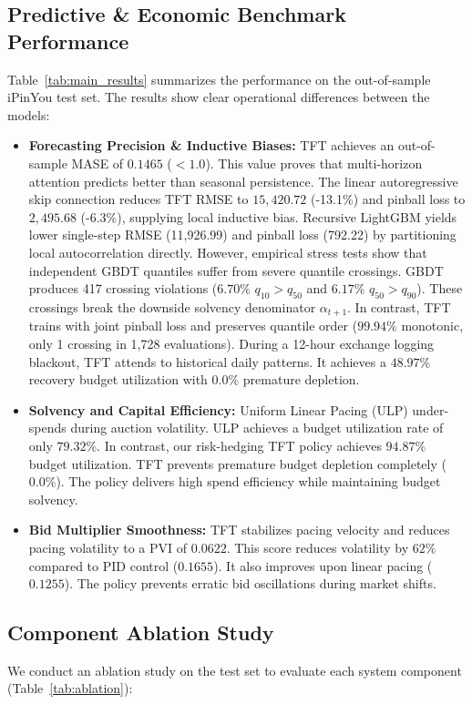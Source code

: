 \documentclass[sigconf]{acmart}
\begin{document}
\subsection{Predictive \& Economic Benchmark Performance}
Table~\ref{tab:main_results} summarizes the performance on the out-of-sample iPinYou test set. The results show clear operational differences between the models:
\begin{itemize}
  \item \textbf{Forecasting Precision \& Inductive Biases:} TFT achieves an out-of-sample MASE of $0.1465$ ($< 1.0$). This value proves that multi-horizon attention predicts better than seasonal persistence. The linear autoregressive skip connection reduces TFT RMSE to $15,420.72$ (-13.1\%) and pinball loss to $2,495.68$ (-6.3\%), supplying local inductive bias. Recursive LightGBM yields lower single-step RMSE (11,926.99) and pinball loss (792.22) by partitioning local autocorrelation directly. However, empirical stress tests show that independent GBDT quantiles suffer from severe quantile crossings. GBDT produces 417 crossing violations ($6.70\%$ $q_{10} > q_{50}$ and $6.17\%$ $q_{50} > q_{90}$). These crossings break the downside solvency denominator $\alpha_{t+1}$. In contrast, TFT trains with joint pinball loss and preserves quantile order ($99.94\%$ monotonic, only 1 crossing in 1,728 evaluations). During a 12-hour exchange logging blackout, TFT attends to historical daily patterns. It achieves a $48.97\%$ recovery budget utilization with $0.0\%$ premature depletion.
  \item \textbf{Solvency and Capital Efficiency:} Uniform Linear Pacing (ULP) under-spends during auction volatility. ULP achieves a budget utilization rate of only $79.32\%$. In contrast, our risk-hedging TFT policy achieves $94.87\%$ budget utilization. TFT prevents premature budget depletion completely ($0.0\%$). The policy delivers high spend efficiency while maintaining budget solvency.
  \item \textbf{Bid Multiplier Smoothness:} TFT stabilizes pacing velocity and reduces pacing volatility to a PVI of $0.0622$. This score reduces volatility by $62\%$ compared to PID control ($0.1655$). It also improves upon linear pacing ($0.1255$). The policy prevents erratic bid oscillations during market shifts.
\end{itemize}

\subsection{Component Ablation Study}
We conduct an ablation study on the test set to evaluate each system component (Table~\ref{tab:ablation}):
\end{document}
